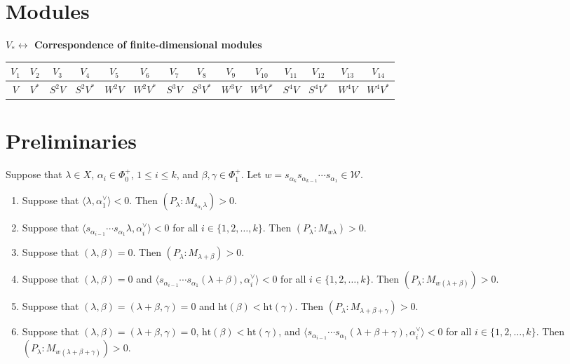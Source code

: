 

\section{Modules}
\begin{center}
\textbf{$V_* \leftrightarrow$ Correspondence of finite-dimensional modules}
\end{center}

\begin{tabular}{|c|c|c|c|c|c|c|c|c|c|c|c|c|c|}
\hline
$V_1$ & $V_2$ & $V_3$ & $V_4$ & $V_5$ & $V_6$ & $V_7$ & $V_8$ & $V_9$ & $V_{10}$ & $V_{11}$ & $V_{12}$ & $V_{13}$ & $V_{14}$ \\
\hline
$V$ & $V^*$ & $S^2 V$ & $S^2 V^*$ & $W^2 V$ & $W^2 V^*$ & $S^3 V$ & $S^3 V^*$ & $W^3 V$ & $W^3 V^*$ & $S^4 V$ & $S^4 V^*$ & $W^4 V$ & $W^4 V^*$ \\
\hline
\end{tabular}



\section{Preliminaries}

\begin{proposition} \label{prop:1}
Suppose that $\lambda \in X$, $\alpha_i \in \Phi_0^+$, $1 \leq i \leq k$, and $\beta, \gamma \in \Phi_1^+$. Let $w = s_{\alpha_k} s_{\alpha_{k-1}} \cdots s_{\alpha_1} \in \mathcal{W}$.

\begin{enumerate}
    \item Suppose that $\langle \lambda, \alpha_1^\vee \rangle < 0$. Then $(P_\lambda : M_{s_{\alpha_1}\lambda}) > 0$.
    
    \item Suppose that $\langle s_{\alpha_{i-1}} \cdots s_{\alpha_1} \lambda, \alpha_i^\vee \rangle < 0$ for all $i \in \{1,2,\ldots,k\}$. Then $(P_\lambda : M_{w\lambda}) > 0$.
    
    \item Suppose that $(\lambda, \beta) = 0$. Then $(P_\lambda : M_{\lambda + \beta}) > 0$.
    
    \item Suppose that $(\lambda, \beta) = 0$ and $\langle s_{\alpha_{i-1}} \cdots s_{\alpha_1} (\lambda + \beta), \alpha_i^\vee \rangle < 0$ for all $i \in \{1,2,\ldots,k\}$. Then $(P_\lambda : M_{w(\lambda + \beta)}) > 0$.
    
    \item Suppose that $(\lambda, \beta) = (\lambda + \beta, \gamma) = 0$ and $\mathrm{ht}(\beta) < \mathrm{ht}(\gamma)$. Then $(P_\lambda : M_{\lambda + \beta + \gamma}) > 0$.
    
    \item Suppose that $(\lambda, \beta) = (\lambda + \beta, \gamma) = 0$, $\mathrm{ht}(\beta) < \mathrm{ht}(\gamma)$, and $\langle s_{\alpha_{i-1}} \cdots s_{\alpha_1} (\lambda + \beta + \gamma), \alpha_i^\vee \rangle < 0$ for all $i \in \{1,2,\ldots,k\}$. Then $(P_\lambda : M_{w(\lambda + \beta + \gamma)}) > 0$.
\end{enumerate}
\end{proposition}


